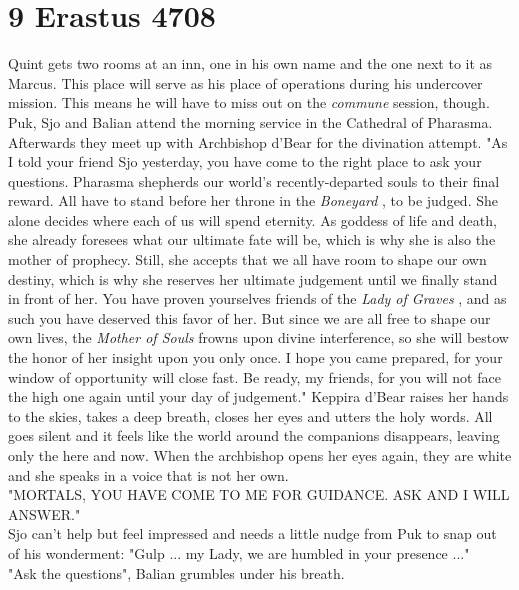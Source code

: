 \section{9 Erastus 4708}

Quint gets two rooms at an inn, one in his own name and the one next to it as Marcus. This place will serve as his place of operations during his undercover mission. This means he will have to miss out on the {\itshape commune} session, though. Puk, Sjo and Balian attend the morning service in the Cathedral of Pharasma. Afterwards they meet up with Archbishop d'Bear for the divination attempt. "As I told your friend Sjo yesterday, you have come to the right place to ask your questions. Pharasma shepherds our world's recently-departed souls to their final reward. All have to stand before her throne in the {\itshape Boneyard} , to be judged. She alone decides where each of us will spend eternity. As goddess of life and death, she already foresees what our ultimate fate will be, which is why she is also the mother of prophecy. Still, she accepts that we all have room to shape our own destiny, which is why she reserves her ultimate judgement until we finally stand in front of her. You have proven yourselves friends of the {\itshape Lady of Graves} , and as such you have deserved this favor of her. But since we are all free to shape our own lives, the  {\itshape Mother of Souls} frowns upon divine interference, so she will bestow the honor of her insight upon you only once. I hope you came prepared, for your window of opportunity will close fast. Be ready, my friends, for you will not face the high one again until your day of judgement." Keppira d'Bear raises her hands to the skies, takes a deep breath, closes her eyes and utters the holy words. All goes silent and it feels like the world around the companions disappears, leaving only the here and now. When the archbishop opens her eyes again, they are white and she speaks in a voice that is not her own.\\

"MORTALS, YOU HAVE COME TO ME FOR GUIDANCE. ASK AND I WILL ANSWER."\\

Sjo can't help but feel impressed and needs a little nudge from Puk to snap out of his wonderment: "Gulp ... my Lady, we are humbled in your presence ..."\\

"Ask the questions", Balian grumbles under his breath.\\

